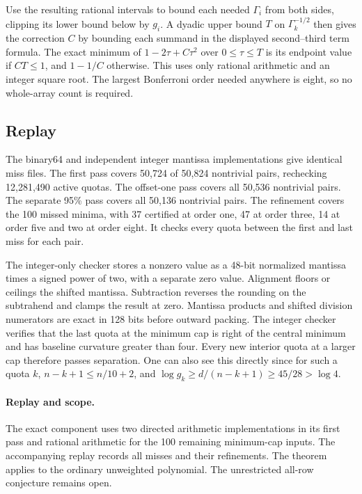 \documentclass[11pt]{article}
\begin{document}
Use the resulting rational intervals to bound each needed $\Gamma_i$ from both sides, clipping its lower bound below by $g_i$. A dyadic upper bound $T$ on $\Gamma_k^{-1/2}$ then gives the correction $C$ by bounding each summand in the displayed second--third term formula. The exact minimum of $1-2\tau+C\tau^2$ over $0\le\tau\le T$ is its endpoint value if $CT\le1$, and $1-1/C$ otherwise. This uses only rational arithmetic and an integer square root. The largest Bonferroni order needed anywhere is eight, so no whole-array count is required.

\subsection{Replay}

The binary64 and independent integer mantissa implementations give identical miss files. The first pass covers 50,724 of 50,824 nontrivial pairs, rechecking 12,281,490 active quotas. The offset-one pass covers all 50,536 nontrivial pairs. The separate 95\% pass covers all 50,136 nontrivial pairs. The refinement covers the 100 missed minima, with 37 certified at order one, 47 at order three, 14 at order five and two at order eight. It checks every quota between the first and last miss for each pair.

The integer-only checker stores a nonzero value as a 48-bit normalized mantissa times a signed power of two, with a separate zero value. Alignment floors or ceilings the shifted mantissa. Subtraction reverses the rounding on the subtrahend and clamps the result at zero. Mantissa products and shifted division numerators are exact in 128 bits before outward packing. The integer checker verifies that the last quota at the minimum cap is right of the central minimum and has baseline curvature greater than four. Every new interior quota at a larger cap therefore passes separation. One can also see this directly since for such a quota $k$, $n-k+1\le n/10+2$, and $\log g_k\ge d/(n-k+1)\ge45/28>\log4$.


\paragraph{Replay and scope.}
The exact component uses two directed arithmetic implementations in its first pass
and rational arithmetic for the 100 remaining minimum-cap inputs. The accompanying
replay records all misses and their refinements. The theorem applies to the ordinary
unweighted polynomial. The unrestricted all-row conjecture remains open.
\end{document}
